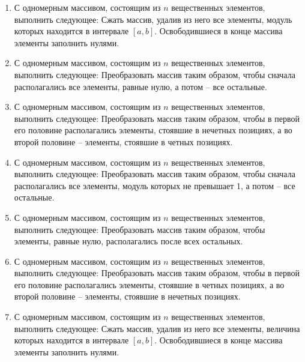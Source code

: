 \begin{enumerate}[leftmargin=*]
    \item С одномерным массивом, состоящим из $n$ вещественных элементов, выполнить следующее: Сжать массив, удалив из него все элементы, модуль которых находится в интервале $[a,b]$.  Освободившиеся в конце массива элементы заполнить нулями.
    \item С одномерным массивом, состоящим из $n$ вещественных элементов, выполнить следующее: Преобразовать массив таким образом, чтобы сначала располагались все элементы, равные нулю, а потом – все остальные.
    \item С одномерным массивом, состоящим из $n$ вещественных элементов, выполнить следующее: Преобразовать массив таким образом, чтобы в первой его половине располагались элементы,  стоявшие в нечетных позициях, а во второй половине – элементы, стоявшие в четных позициях.
    \item С одномерным массивом, состоящим из $n$ вещественных элементов, выполнить следующее: Преобразовать массив таким образом, чтобы сначала располагались все элементы, модуль которых не превышает 1, а потом – все остальные.
    \item С одномерным массивом, состоящим из $n$ вещественных элементов, выполнить следующее: Преобразовать массив таким образом, чтобы элементы, равные нулю, располагались после всех остальных.
    \item С одномерным массивом, состоящим из $n$ вещественных элементов, выполнить следующее: Преобразовать массив таким образом, чтобы в первой его половине располагались элементы,  стоявшие в четных позициях, а во второй половине – элементы, стоявшие в нечетных позициях.
    \item С одномерным массивом, состоящим из $n$ вещественных элементов, выполнить следующее: Сжать массив, удалив из него все элементы, величина которых находится в интервале $[a,b]$. Освободившиеся в конце массива элементы заполнить нулями.
\end{enumerate}
